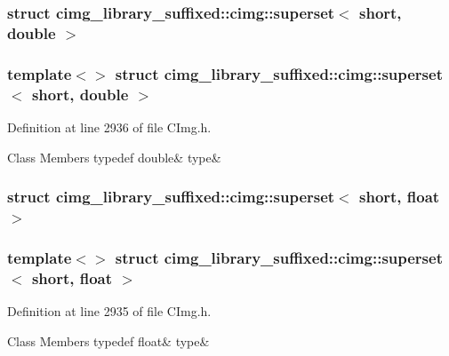 \subsubsection{struct cimg\+\_\+library\+\_\+suffixed\+:\+:cimg\+:\+:superset$<$ short, double $>$}
\subsubsection*{template$<$$>$\newline
struct cimg\+\_\+library\+\_\+suffixed\+::cimg\+::superset$<$ short, double $>$}



Definition at line 2936 of file C\+Img.\+h.

\begin{DoxyFields}{Class Members}
\mbox{\label{namespacecimg__library__suffixed_1_1cimg_a0a56e1f9affc534c80e19c719ec29cdf}} 
typedef double&
type&
\\
\hline

\end{DoxyFields}
\label{structcimg__library__suffixed_1_1cimg_1_1superset_3_01short_00_01float_01_4}
\subsubsection{struct cimg\+\_\+library\+\_\+suffixed\+:\+:cimg\+:\+:superset$<$ short, float $>$}
\subsubsection*{template$<$$>$\newline
struct cimg\+\_\+library\+\_\+suffixed\+::cimg\+::superset$<$ short, float $>$}



Definition at line 2935 of file C\+Img.\+h.

\begin{DoxyFields}{Class Members}
\mbox{\label{namespacecimg__library__suffixed_1_1cimg_acee74c374a8be813324e20ccd3dee19a}} 
typedef float&
type&
\\
\hline

\end{DoxyFields}
\label{structcimg__library__suffixed_1_1cimg_1_1superset_3_01short_00_01int_01_4}
